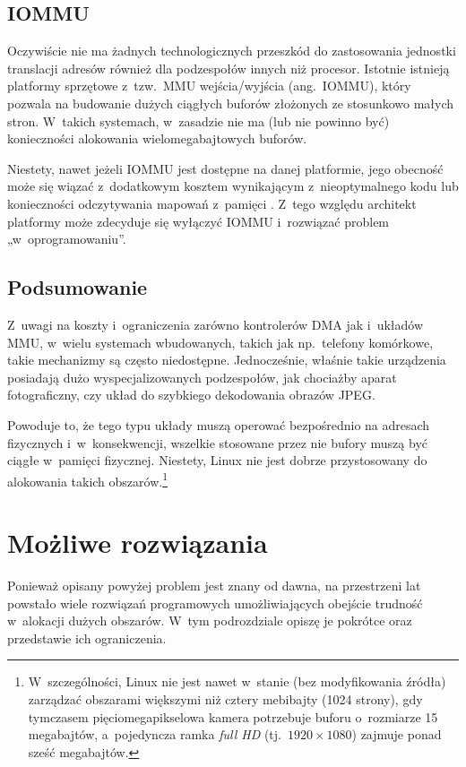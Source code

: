 \subsection{IOMMU}

Oczywiście nie ma żadnych technologicznych przeszkód do zastosowania
jednostki translacji adresów również dla podzespołów innych niż
procesor.  Istotnie istnieją platformy sprzętowe z~tzw.\ MMU
wejścia/wyjścia (ang.\ IOMMU), który pozwala na budowanie dużych
ciągłych buforów złożonych ze stosunkowo małych stron.  W~takich
systemach, w~zasadzie nie ma (lub nie powinno być) konieczności
alokowania wielomegabajtowych buforów.

Niestety, nawet jeżeli IOMMU jest dostępne na danej platformie, jego
obecność może się wiązać z~dodatkowym kosztem wynikającym
z~nieoptymalnego kodu \autocite{bib:price-of-safety} lub konieczności
odczytywania mapowań z~pamięci
\autocite{bib:mitigate-iotlb-bottleneck}.  Z~tego względu architekt
platformy może zdecyduje się wyłączyć IOMMU i~rozwiązać problem
„w~oprogramowaniu”.

\subsection{Podsumowanie}

Z~uwagi na koszty i~ograniczenia zarówno kontrolerów DMA jak i~układów
MMU, w~wielu systemach wbudowanych, takich jak np.\ telefony
komórkowe, takie mechanizmy są często niedostępne.  Jednocześnie,
właśnie takie urządzenia posiadają dużo wyspecjalizowanych
podzespołów, jak chociażby aparat fotograficzny, czy układ do
szybkiego dekodowania obrazów JPEG.

Powoduje to, że tego typu układy muszą operować bezpośrednio na
adresach fizycznych i~w~konsekwencji, wszelkie stosowane przez nie
bufory muszą być ciągłe w~pamięci fizycznej.  Niestety, Linux nie jest
dobrze przystosowany do alokowania takich
obszarów.\footnote{W~szczególności, Linux nie jest nawet w~stanie (bez
  modyfikowania źródła) zarządzać obszarami większymi niż cztery
  mebibajty (1024 strony), gdy tymczasem pięciomegapikselowa kamera
  potrzebuje buforu o~rozmiarze 15 megabajtów, a~pojedyncza ramka {\it
    full HD} (tj.\ $1920 \times 1080$) zajmuje ponad sześć megabajtów.}


\section{Możliwe rozwiązania}

Ponieważ opisany powyżej problem jest znany od dawna, na przestrzeni
lat powstało wiele rozwiązań programowych umożliwiających obejście
trudność w~alokacji dużych obszarów.  W~tym podrozdziale opiszę je
pokrótce oraz przedstawie ich ograniczenia.

